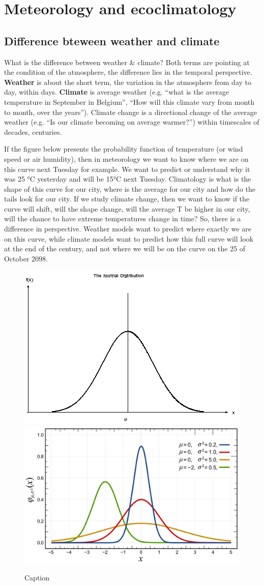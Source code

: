 \documentclass[oneside]{book}
\begin{document}
\section{Meteorology and
ecoclimatology}\label{meteorology-and-ecoclimatology}

\subsection{Difference bteween weather and
climate}\label{difference-bteween-weather-and-climate}

What is the difference between weather \& climate? Both terms are
pointing at the condition of the atmosphere, the difference lies in the
temporal perspective. \textbf{Weather} is about the short term, the
variation in the atmosphere from day to day, within days.
\textbf{Climate} is average weather (e.g. ``what is the average
temperature in September in Belgium'', ``How will this climate vary from
month to month, over the years''). Climate change is a directional
change of the average weather (e.g. ``Is our climate becoming on average
warmer?'') within timescales of decades, centuries.

If the figure below presents the probability function of temperature (or
wind speed or air humidity), then in meteorology we want to know where
we are on this curve next Tuesday for example. We want to predict or
understand why it was 25 °C yesterday and will be 15°C next Tuesday.
Climatology is what is the shape of this curve for our city, where is
the average for our city and how do the tails look for our city. If we
study climate change, then we want to know if the curve will shift, will
the shape change, will the average T be higher in our city, will the
chance to have extreme temperatures change in time? So, there is a
difference in perspective. Weather models want to predict where exactly
we are on this curve, while climate models want to predict how this full
curve will look at the end of the century, and not where we will be on
the curve on the 25 of October 2098.

\begin{figure}

{\centering \includegraphics[width=0.4\linewidth]{figures/Figure16a} \includegraphics[width=0.4\linewidth]{figures/Figure16b} 

}

\caption{Caption}\label{fig:Climatedef}
\end{figure}
\end{document}
